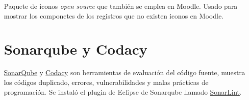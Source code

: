 Paquete de iconos \cite{noauthor_font_nodate} \textit{open source} que también se emplea en Moodle. 
Usado para mostrar los componetes de los registros que no existen iconos en Moodle.

\section{Sonarqube y Codacy}

\href{https://www.sonarqube.org/}{SonarQube} y \href{https://www.codacy.com/}{Codacy} son herramientas de evaluación del código fuente, muestra los códigos duplicado, errores, vulnerabilidades y malas prácticas de programación. 
Se instaló el plugin de Eclipse de Sonarqube llamado \href{https://www.sonarlint.org/}{SonarLint}.
